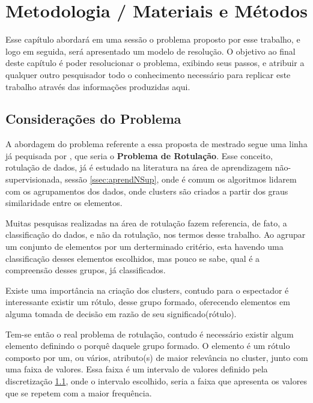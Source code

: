 \chapter{Metodologia / Materiais e Métodos}\label{cap:ferramentas}
Esse capítulo abordará em uma sessão o problema proposto por esse trabalho, e logo em seguida, será apresentado um modelo de resolução. O objetivo ao final deste capítulo é poder resolucionar o problema, exibindo seus passos, e atribuir a qualquer outro pesquisador todo o conhecimento necessário para replicar este trabalho através das informações produzidas aqui.

\section{Considerações do Problema}

A abordagem do problema referente a essa proposta de mestrado segue uma linha já pequisada por \cite{Lopes}, que seria o \textbf{Problema de Rotulação}. Esse conceito, rotulação de dados,  já é estudado na literatura na área de aprendizagem não-supervisionada, sessão \ref{ssec:aprendNSup}, onde é comum os algoritmos lidarem com os agrupamentos dos dados, onde clusters são criados a partir dos graus similaridade entre os elementos.

Muitas pesquisas realizadas na área de rotulação fazem referencia, de fato, a classificação do dados, e não da rotulação, nos termos desse trabalho. Ao agrupar um conjunto de elementos por um derterminado critério, esta havendo uma classificação desses elementos escolhidos, mas pouco se sabe, qual é a compreensão desses grupos, já classificados. 

Existe uma importância na criação dos clusters, contudo para o espectador é interessante existir um rótulo, desse grupo formado, oferecendo elementos em alguma tomada de decisão em razão de seu significado(rótulo).

Tem-se então o real problema de rotulação, contudo é necessário existir algum elemento definindo o porquê daquele grupo formado. O elemento é um rótulo composto por um, ou vários, atributo(s) de maior relevância no cluster, junto com uma faixa de valores. Essa faixa é um intervalo de valores definido pela discretização \ref{}, onde o intervalo escolhido, seria a faixa que apresenta os valores que se repetem com a maior frequência.

